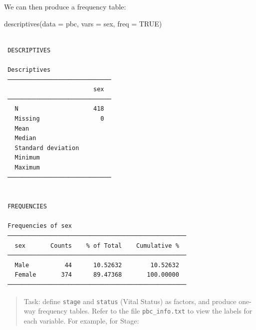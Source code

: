 \documentclass[
  a4paper,
]{memoir}
\newenvironment{Shaded}{\begin{snugshade}}{\end{snugshade}}
\newcommand{\AttributeTok}[1]{\textcolor[rgb]{0.00,0.00,0.00}{#1}}
\newcommand{\ConstantTok}[1]{\textcolor[rgb]{0.00,0.00,0.00}{#1}}
\newcommand{\DecValTok}[1]{\textcolor[rgb]{0.00,0.00,0.00}{#1}}
\newcommand{\FunctionTok}[1]{\textcolor[rgb]{0.00,0.00,0.00}{#1}}
\newcommand{\NormalTok}[1]{\textcolor[rgb]{0.00,0.00,0.00}{#1}}
\newcommand{\OtherTok}[1]{\textcolor[rgb]{0.00,0.00,0.00}{#1}}
\newcommand{\SpecialCharTok}[1]{\textcolor[rgb]{0.00,0.00,0.00}{#1}}
\newcommand{\StringTok}[1]{\textcolor[rgb]{0.00,0.00,0.00}{#1}}
\begin{document}
We can then produce a frequency table:

\begin{Shaded}
\begin{Highlighting}[]
\FunctionTok{descriptives}\NormalTok{(}\AttributeTok{data =}\NormalTok{ pbc, }\AttributeTok{vars =}\NormalTok{ sex, }\AttributeTok{freq =} \ConstantTok{TRUE}\NormalTok{)}
\end{Highlighting}
\end{Shaded}

\begin{verbatim}

 DESCRIPTIVES

 Descriptives                  
 ───────────────────────────── 
                         sex   
 ───────────────────────────── 
   N                     418   
   Missing                 0   
   Mean                        
   Median                      
   Standard deviation          
   Minimum                     
   Maximum                     
 ───────────────────────────── 


 FREQUENCIES

 Frequencies of sex                                 
 ────────────────────────────────────────────────── 
   sex       Counts    % of Total    Cumulative %   
 ────────────────────────────────────────────────── 
   Male          44      10.52632        10.52632   
   Female       374      89.47368       100.00000   
 ────────────────────────────────────────────────── 
\end{verbatim}

\begin{quote}
Task: define \texttt{stage} and \texttt{status} (Vital Status) as
factors, and produce one-way frequency tables. Refer to the file
\texttt{pbc\_info.txt} to view the labels for each variable. For
example, for Stage:
\end{quote}

\begin{Shaded}
\end{Shaded}
\end{document}
